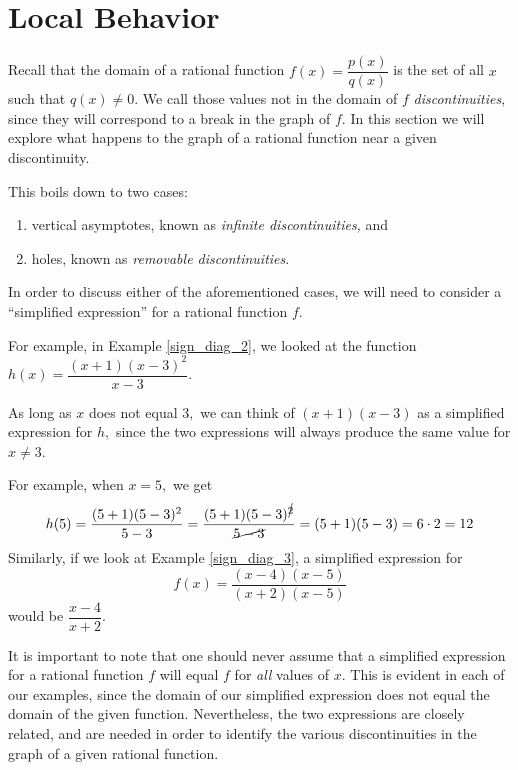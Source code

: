 \documentclass[12pt]{book}
\theoremstyle{definition}
\begin{document}
\section{Local Behavior}
Recall that the domain of a rational function $f(x)=\dfrac{p(x)}{q(x)}$ is the set of all $x$ such that $q(x)\neq 0$.  We call those values not in the domain of $f$ {\it discontinuities}, since they will correspond to a break in the graph of $f$.  In this section we will explore what happens to the graph of a rational function near a given discontinuity.
\par
This boils down to two cases:
\begin{enumerate}
\item vertical asymptotes, known as {\it infinite discontinuities,} and
\item holes, known as {\it removable discontinuities}.
\end{enumerate}
In order to discuss either of the aforementioned cases, we will need to consider a ``simplified expression'' for a rational function $f$.
\par
For example, in Example \ref{sign_diag_2}, we looked at the function $h(x)=\dfrac{(x+1)(x-3)^2}{x-3}$.
\par
As long as $x$ does not equal $3,$ we can think of $(x+1)(x-3)$ as a simplified expression for $h,$ since the two expressions will always produce the same value for $x\neq 3$.
\par
For example, when $x=5,$ we get
$$h(5)=\dfrac{(5+1)(5-3)^2}{5-3}=\dfrac{(5+1)(5-3)^{\cancel{2}}}{\cancel{5-3}}=(5+1)(5-3)=6\cdot 2=12$$
Similarly, if we look at Example \ref{sign_diag_3}, a simplified expression for 
$$f(x)=\dfrac{(x-4)(x-5)}{(x+2)(x-5)}$$
would be $\dfrac{x-4}{x+2}$.
\par
It is important to note that one should never assume that a simplified expression for a rational function $f$ will equal $f$ for {\it all} values of $x$.  This is evident in each of our examples, since the domain of our simplified expression does not equal the domain of the given function.  Nevertheless, the two expressions are closely related, and are needed in order to identify the various discontinuities in the graph of a given rational function.
\end{document}
